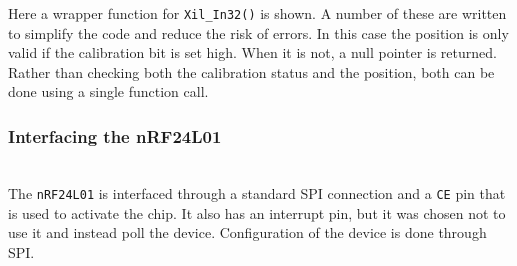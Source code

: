 Here a wrapper function for \texttt{Xil\_In32()} is shown.
A number of these are written to simplify the code and reduce the risk of errors.
In this case the position is only valid if the calibration bit is set high.
When it is not, a null pointer is returned.
Rather than checking both the calibration status and the position, both can be done using a single function call.

\subsubsection{Interfacing the nRF24L01} %
\label{ssubs:nrf24l01}
~\\
The \texttt{nRF24L01} is interfaced through a standard SPI connection and a \texttt{CE} pin that is used to activate the chip. 
It also has an interrupt pin, but it was chosen not to use it and instead poll the device. 
Configuration of the device is done through SPI.

